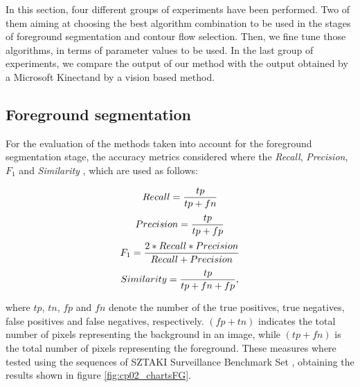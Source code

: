 In this section, four different groups of experiments have been performed. Two of them aiming at choosing the best 
algorithm combination to be used in the stages of foreground segmentation and contour flow selection. Then, we fine 
tune those algorithms, in terms of parameter values to be used. In the last group of experiments, we compare the output 
of our method with the output obtained by a Microsoft Kinect\textregistered and by a vision based method.

\subsection{Foreground segmentation}\label{ch:chapter02_02_01}

For the evaluation of the methods taken into account for the foreground segmentation stage, the accuracy metrics considered where the \textit{Recall}, \textit{Precision}, \textit{$F_1$} and \textit{Similarity} \cite{maddalena2008self}, which are used as follows:

\begin{equation}\label{eq_Recall}
Recall = { tp \over { tp + fn } }
\end{equation}
\begin{equation}\label{eq_Precision}
Precision = { tp \over { tp + fp } }
\end{equation}
\begin{equation}\label{eq_F1}
F_1 = { {2 * Recall * Precision} \over {Recall + Precision} }
\end{equation}
\begin{equation}\label{eq_Similarity}
Similarity = { tp \over { tp + fn + fp } },
\end{equation}

where $tp$, $tn$, $fp$ and $fn$ denote the number of the true positives, true negatives, false positives and false negatives, respectively. $(fp + tn)$ indicates the total number of pixels representing the background in an image, while $(tp + fn)$ is the total number of pixels representing the foreground.
These measures where tested using the sequences of SZTAKI Surveillance Benchmark Set \cite{benedek2008bayesian}, obtaining the results shown in figure \ref{fig:cp02_chartsFG}.

